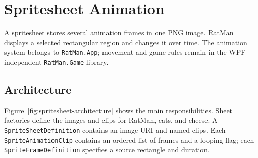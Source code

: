 
\chapter{Spritesheet Animation}
\label{chap:spritesheet-animation}

A spritesheet stores several animation frames in one PNG image. RatMan displays a selected rectangular region and changes it over time. The animation system belongs to \texttt{RatMan.App}; movement and game rules remain in the WPF-independent \texttt{RatMan.Game} library.

\section{Architecture}

Figure~\ref{fig:spritesheet-architecture} shows the main responsibilities. Sheet factories define the images and clips for RatMan, cats, and cheese. A \texttt{SpriteSheetDefinition} contains an image URI and named clips. Each \texttt{SpriteAnimationClip} contains an ordered list of frames and a looping flag; each \texttt{SpriteFrameDefinition} specifies a source rectangle and duration.

